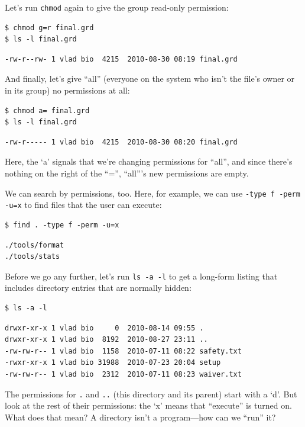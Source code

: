 \documentclass[]{book}
\begin{document}
Let's run \texttt{chmod} again to give the group read-only permission:

\begin{verbatim}
$ chmod g=r final.grd
$ ls -l final.grd
\end{verbatim}

\begin{verbatim}
-rw-r--rw- 1 vlad bio  4215  2010-08-30 08:19 final.grd
\end{verbatim}

And finally, let's give ``all'' (everyone on the system who isn't the
file's owner or in its group) no permissions at all:

\begin{verbatim}
$ chmod a= final.grd
$ ls -l final.grd
\end{verbatim}

\begin{verbatim}
-rw-r----- 1 vlad bio  4215  2010-08-30 08:20 final.grd
\end{verbatim}

Here, the `a' signals that we're changing permissions for ``all'', and
since there's nothing on the right of the ``='', ``all'''s new
permissions are empty.

We can search by permissions, too. Here, for example, we can use
\texttt{-type f -perm -u=x} to find files that the user can execute:

\begin{verbatim}
$ find . -type f -perm -u=x
\end{verbatim}

\begin{verbatim}
./tools/format
./tools/stats
\end{verbatim}

Before we go any further, let's run \texttt{ls -a -l} to get a long-form
listing that includes directory entries that are normally hidden:

\begin{verbatim}
$ ls -a -l
\end{verbatim}

\begin{verbatim}
drwxr-xr-x 1 vlad bio     0  2010-08-14 09:55 .
drwxr-xr-x 1 vlad bio  8192  2010-08-27 23:11 ..
-rw-rw-r-- 1 vlad bio  1158  2010-07-11 08:22 safety.txt
-rwxr-xr-x 1 vlad bio 31988  2010-07-23 20:04 setup
-rw-rw-r-- 1 vlad bio  2312  2010-07-11 08:23 waiver.txt
\end{verbatim}

The permissions for \texttt{.} and \texttt{..} (this directory and its
parent) start with a `d'. But look at the rest of their permissions: the
`x' means that ``execute'' is turned on. What does that mean? A
directory isn't a program---how can we ``run'' it?
\end{document}
